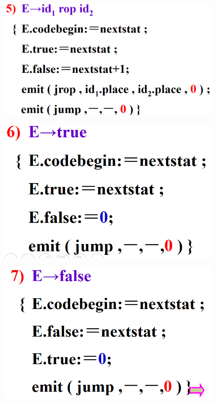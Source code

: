 \documentclass[UTF8,a4paper]{ctexart}
\begin{document}
 \begin{figure}[H]
  \centering
  \includegraphics[scale = 0.3]{assets/CompilerConstructionPrinciples_38961.png}
 \end{figure}

 \begin{figure}[H]
  \centering
  \includegraphics[scale = 0.3]{assets/CompilerConstructionPrinciples_4c318.png}
 \end{figure}

 \begin{figure}[H]
  \centering
  \includegraphics[scale = 0.3]{assets/CompilerConstructionPrinciples_f65f3.png}
 \end{figure}
\end{document}
